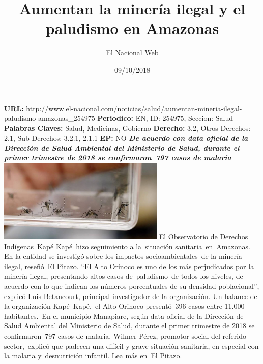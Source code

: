 \documentclass{article}%
\title{\textbf{Aumentan la minería ilegal y el paludismo en Amazonas}}%
\author{El Nacional Web}%
\date{09/10/2018}%
\begin{document}
%
\normalsize%
\maketitle%
\textbf{URL: }%
http://www.el{-}nacional.com/noticias/salud/aumentan{-}mineria{-}ilegal{-}paludismo{-}amazonas\_254975\newline%
%
\textbf{Periodico: }%
EN, %
ID: %
254975, %
Seccion: %
Salud\newline%
%
\textbf{Palabras Claves: }%
Salud, Medicinas, Gobierno\newline%
%
\textbf{Derecho: }%
3.2, %
Otros Derechos: %
2.1, %
Sub Derechos: %
3.2.1, 2.1.1\newline%
%
\textbf{EP: }%
NO\newline%
\newline%
%
\textbf{\textit{De acuerdo con data oficial de la Dirección de Salud Ambiental del Ministerio de Salud, durante el primer trimestre de 2018 se confirmaron~797 casos de malaria}}%
\newline%
\newline%
%
\includegraphics[width=300px]{101.jpg}%
\newline%
%
El Observatorio de Derechos Indígenas~Kapé Kapé~hizo seguimiento a la~situación sanitaria~en~Amazonas. En la entidad se investigó sobre los impactos socioambientales~de la minería ilegal, reseñó~El Pitazo.%
\newline%
%
“El Alto Orinoco es uno de los más perjudicados por la minería ilegal, presentando altos casos de~paludismo~de todos los niveles, de acuerdo con lo que indican los números porcentuales de su densidad poblacional”, explicó Luis Betancourt, principal investigador de la organización.%
\newline%
%
Un balance de la organización Kapé~Kapé,~el Alto Orinoco presentó~396 casos entre 11.000 habitantes.~En el municipio Manapiare, según data oficial de la Dirección de Salud Ambiental del Ministerio de Salud, durante el primer trimestre de 2018 se confirmaron~797 casos de malaria.%
\newline%
%
Wilmer Pérez, promotor social del referido sector,~explicó que padecen una difícil y grave situación sanitaria, en especial con la malaria y~desnutrición infantil.%
\newline%
%
Lea más en~El Pitazo.%
\newline%
%
\end{document}

